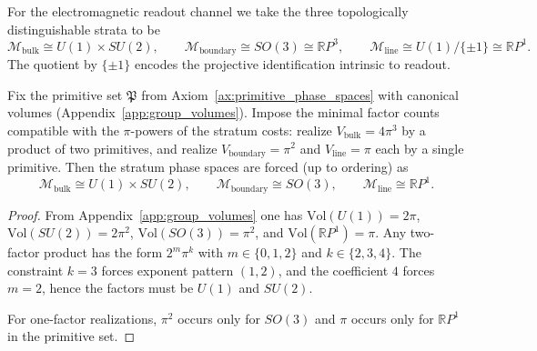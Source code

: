 \begin{axiom}
\label{ax:em_phase_spaces}
For the electromagnetic readout channel we take the three topologically distinguishable strata to be
\begin{equation}
\mathcal{M}_{\mathrm{bulk}} \cong U(1)\times SU(2),\qquad
\mathcal{M}_{\mathrm{boundary}} \cong SO(3) \cong \mathbb{R}P^3,\qquad
\mathcal{M}_{\mathrm{line}} \cong U(1)/\{\pm 1\} \cong \mathbb{R}P^1.
\end{equation}
The quotient by $\{\pm 1\}$ encodes the projective identification intrinsic to readout.
\end{axiom}

\begin{proposition}\label{prop:alpha_phase_factorization_rigidity}
Fix the primitive set $\mathfrak{P}$ from Axiom~\ref{ax:primitive_phase_spaces} with canonical volumes (Appendix~\ref{app:group_volumes}). Impose the minimal factor counts compatible with the $\pi$-powers of the stratum costs: realize $V_{\mathrm{bulk}}=4\pi^3$ by a product of two primitives, and realize $V_{\mathrm{boundary}}=\pi^2$ and $V_{\mathrm{line}}=\pi$ each by a single primitive. Then the stratum phase spaces are forced (up to ordering) as
\[
\mathcal{M}_{\mathrm{bulk}}\cong U(1)\times SU(2),\qquad
\mathcal{M}_{\mathrm{boundary}}\cong SO(3),\qquad
\mathcal{M}_{\mathrm{line}}\cong \mathbb{R}P^1.
\]
\end{proposition}
\begin{proof}
From Appendix~\ref{app:group_volumes} one has $\mathrm{Vol}(U(1))=2\pi$, $\mathrm{Vol}(SU(2))=2\pi^2$, $\mathrm{Vol}(SO(3))=\pi^2$, and $\mathrm{Vol}(\mathbb{R}P^1)=\pi$. Any two-factor product has the form $2^{m}\pi^{k}$ with $m\in\{0,1,2\}$ and $k\in\{2,3,4\}$. The constraint $k=3$ forces exponent pattern $(1,2)$, and the coefficient $4$ forces $m=2$, hence the factors must be $U(1)$ and $SU(2)$.

For one-factor realizations, $\pi^2$ occurs only for $SO(3)$ and $\pi$ occurs only for $\mathbb{R}P^1$ in the primitive set.
\end{proof}

